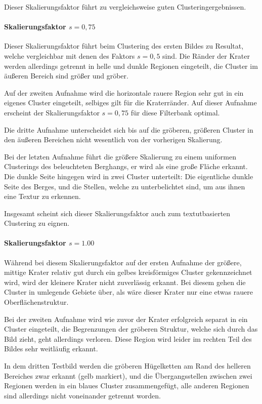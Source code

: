 Dieser Skalierungsfaktor führt zu vergleichsweise guten Clusteringergebnissen.

\paragraph{Skalierungsfaktor $s=0,75$}

Dieser Skalierungsfaktor führt beim Clustering des ersten Bildes zu Resultat, welche vergleichbar mit denen des Faktors $s=0,5$ sind. Die Ränder der Krater werden allerdings getrennt in helle und dunkle Regionen eingeteilt, die Cluster im äußeren Bereich sind größer und gröber.

Auf der zweiten Aufnahme wird die horizontale rauere Region sehr gut in ein eigenes Cluster eingeteilt, selbiges gilt für die Kraterränder. Auf dieser Aufnahme erscheint der Skalierungsfaktor $s=0,75$ für diese Filterbank optimal.

Die dritte Aufnahme unterscheidet sich bis auf die gröberen, größeren Cluster in den äußeren Bereichen nicht wesentlich von der vorherigen Skalierung.

Bei der letzten Aufnahme führt die größere Skalierung zu einem uniformen Clusterings des beleuchteten Berghangs, er wird als eine große Fläche erkannt. Die dunkle Seite hingegen wird in zwei Cluster unterteilt: Die eigentliche dunkle Seite des Berges, und die Stellen, welche zu unterbelichtet sind, um aus ihnen eine Textur zu erkennen.

Insgesamt scheint sich dieser Skalierungsfaktor auch zum textutbasierten Clustering zu eignen.

\paragraph{Skalierungsfaktor $s=1.00$}

Während bei diesem Skalierungsfaktor auf der ersten Aufnahme der größere, mittige Krater relativ gut durch ein gelbes kreisförmiges Cluster gekennzeichnet wird, wird der kleinere Krater nicht zuverlässig erkannt. Bei diesem gehen die Cluster in umlegende Gebiete über, als wäre dieser Krater nur eine etwas rauere Oberflächenstruktur.

Bei der zweiten Aufnahme wird wie zuvor der Krater erfolgreich separat in ein Cluster eingeteilt, die Begrenzungen der gröberen Struktur, welche sich durch das Bild zieht, geht allerdings verloren. Diese Region wird leider im rechten Teil des Bildes sehr weitläufig erkannt.

In dem dritten Testbild werden die gröberen Hügelketten am Rand des helleren Bereiches zwar erkannt (gelb markiert), und die Übergangsstellen zwischen zwei Regionen werden in ein blaues Cluster zusammengefügt, alle anderen Regionen sind allerdings nicht voneinander getrennt worden.

